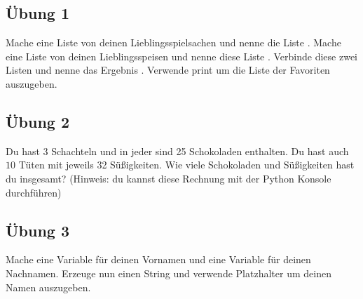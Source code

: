 \subsection*{Übung 1}
Mache eine Liste von deinen Lieblingsspielsachen und nenne die Liste . Mache eine Liste von deinen Lieblingsspeisen und nenne diese Liste . Verbinde diese zwei Listen und nenne das Ergebnis . Verwende print um die Liste der Favoriten auszugeben.

\subsection*{Übung 2}
Du hast 3 Schachteln und in jeder sind 25 Schokoladen enthalten. Du hast auch $10$ Tüten mit jeweils 32 Süßigkeiten. Wie viele Schokoladen und Süßigkeiten hast du insgesamt? (Hinweis: du kannst diese Rechnung mit der Python Konsole durchführen)

\subsection*{Übung 3}
Mache eine Variable für deinen Vornamen und eine Variable für deinen Nachnamen. Erzeuge nun einen String und verwende Platzhalter um deinen Namen auszugeben.

\newpage
